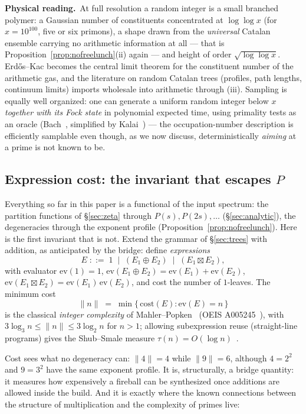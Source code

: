 \documentclass[11pt]{article}
\newcommand{\physread}{\medskip\noindent\textbf{Physical reading.}\ }
\numberwithin{equation}{section}
\theoremstyle{plain}
\theoremstyle{definition}
\theoremstyle{remark}
\begin{document}
\physread At full resolution a random integer is a small branched polymer: a Gaussian
number of constituents concentrated at $\log\log x$ (for $x = 10^{100}$, five or six
primons), a shape drawn from the \emph{universal} Catalan ensemble carrying no
arithmetic information at all --- that is Proposition~\ref{prop:nofreelunch}(ii)
again --- and height of order $\sqrt{\log\log x}$. Erd\H{o}s--Kac becomes the central
limit theorem for the constituent number of the arithmetic gas, and the literature on
random Catalan trees (profiles, path lengths, continuum limits) imports wholesale
into arithmetic through (iii). Sampling is equally well organized: one can generate a
uniform random integer below $x$ \emph{together with its Fock state} in polynomial
expected time, using primality tests as an oracle (Bach~\cite{bach}, simplified by
Kalai~\cite{kalai}) --- the occupation-number description is efficiently samplable
even though, as we now discuss, deterministically \emph{aiming} at a prime is not
known to be.

\subsection{Expression cost: the invariant that escapes $P$}\label{sec:cost}

Everything so far in this paper is a functional of the input spectrum: the partition
functions of \S\ref{sec:zeta} through $P(s), P(2s), \dots$ (\S\ref{sec:analytic}),
the degeneracies through the exponent profile
(Proposition~\ref{prop:nofreelunch}). Here is the first invariant that is not.
Extend the grammar of \S\ref{sec:trees} with addition, as anticipated by the bridge:
define \emph{expressions}
\[
E \;::=\; 1 \;\mid\; (E_1 \oplus E_2) \;\mid\; (E_1 \boxtimes E_2),
\]
with evaluator $\mathrm{ev}(1) = 1$,
$\mathrm{ev}(E_1 \oplus E_2) = \mathrm{ev}(E_1) + \mathrm{ev}(E_2)$,
$\mathrm{ev}(E_1 \boxtimes E_2) = \mathrm{ev}(E_1)\,\mathrm{ev}(E_2)$, and cost the
number of $1$-leaves. The minimum cost
\[
\|n\| \;=\; \min\{\,\mathrm{cost}(E) : \mathrm{ev}(E) = n\,\}
\]
is the classical \emph{integer complexity} of Mahler--Popken~\cite{mahlerpopken}
(OEIS A005245~\cite{oeis}), with $3\log_3 n \le \|n\| \le 3\log_2 n$ for $n > 1$;
allowing subexpression reuse (straight-line programs) gives the Shub--Smale measure
$\tau(n) = O(\log n)$~\cite{shubsmale}.

Cost sees what no degeneracy can: $\|4\| = 4$ while $\|9\| = 6$, although $4 = 2^2$
and $9 = 3^2$ have the same exponent profile. It is, structurally, a bridge quantity:
it measures how expensively a fireball can be synthesized once additions are allowed
inside the build. And it is exactly where the known connections between the structure
of multiplication and the complexity of primes live:
\end{document}
